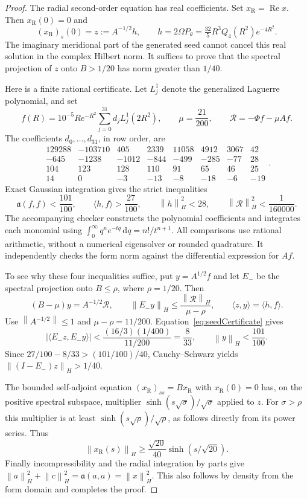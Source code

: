 \documentclass[11pt]{article}
\theoremstyle{remark}
\newcommand{\dd}{\,\mathrm d}
\newcommand{\norm}[1]{\left\lVert#1\right\rVert}
\begin{document}
\begin{proof}
The radial second-order equation has real coefficients. Set
$x_{\mathrm R}=\operatorname{Re}x$. Then $x_{\mathrm R}(0)=0$ and
\[
 (x_{\mathrm R})_s(0)=z:=A^{-1/2}h,\qquad
 h=2\Omega P_\theta=\tfrac{32}{5}R^3Q_4(R^2)e^{-4R^2}.
\]
The imaginary meridional part of the generated seed cannot cancel this
real solution in the complex Hilbert norm. It suffices to prove that
the spectral projection of $z$ onto $B>1/20$ has norm greater than $1/40$.

Here is a finite rational certificate. Let $L_j^1$ denote the generalized
Laguerre polynomial, and set
\[
 f(R)=10^{-5}Re^{-R^2}\sum_{j=0}^{31}d_jL_j^1(2R^2),
 \qquad \mu=\frac{21}{200},\qquad
 \mathcal R=-\Phi f-\mu Af.
\]
The coefficients $d_0,\ldots,d_{31}$, in row order, are
\[
 \begin{array}{rrrrrrrr}
 129288&-103710&405&2339&11058&4912&3067&42\\
 -645&-1238&-1012&-844&-499&-285&-77&28\\
 104&123&128&110&91&65&46&25\\
 14&0&-3&-13&-8&-18&-6&-19
 \end{array}.
\]
Exact Gaussian integration gives the strict inequalities
\begin{equation}\label{eq:seedCertificate}
 \mathfrak a(f,f)<\frac{101}{100},\qquad
 \langle h,f\rangle>\frac{27}{100},\qquad
 \norm h_H^2<28,\qquad
 \norm{\mathcal R}_H^2<\frac1{160000}.
\end{equation}
The accompanying checker constructs the polynomial coefficients and
integrates each monomial using
$\int_0^\infty q^ne^{-tq}\dd q=n!/t^{n+1}$.
All comparisons use rational arithmetic, without a numerical eigensolver
or rounded quadrature. It independently checks the form norm against
the differential expression for $Af$.

To see why these four inequalities suffice, put $y=A^{1/2}f$ and let
$E_-$ be the spectral projection onto $B\leq\rho$, where $\rho=1/20$.
Then
\[
 (B-\mu)y=A^{-1/2}\mathcal R,\qquad
 \norm{E_-y}_H\leq\frac{\norm{\mathcal R}_H}{\mu-\rho},\qquad
 \langle z,y\rangle=\langle h,f\rangle.
\]
Use $\norm{A^{-1/2}}\leq1$ and
$\mu-\rho=11/200$. Equation~\eqref{eq:seedCertificate} gives
\[
 |\langle E_-z,E_-y\rangle|
 <\frac{(16/3)(1/400)}{11/200}=\frac8{33},\qquad
 \norm y_H<\frac{101}{100}.
\]
Since $27/100-8/33>(101/100)/40$, Cauchy--Schwarz yields
$\norm{(I-E_-)z}_H>1/40$.

The bounded self-adjoint equation $(x_{\mathrm R})_{ss}=Bx_{\mathrm R}$
with $x_{\mathrm R}(0)=0$ has, on
the positive spectral subspace, multiplier
$\sinh(s\sqrt\sigma)/\sqrt\sigma$ applied to $z$.
For $\sigma>\rho$ this multiplier is at least
$\sinh(s\sqrt\rho)/\sqrt\rho$, as follows directly from its power
series. Thus
\[
 \norm{x_{\mathrm R}(s)}_H
       \geq\frac{\sqrt{20}}{40}\sinh(s/\sqrt{20}).
\]
Finally incompressibility and the radial integration by parts give
$\norm a_H^2+\norm c_H^2=\mathfrak a(a,a)=\norm x_H^2$.
This also follows by density from the form domain and completes the proof.
\end{proof}
\end{document}
